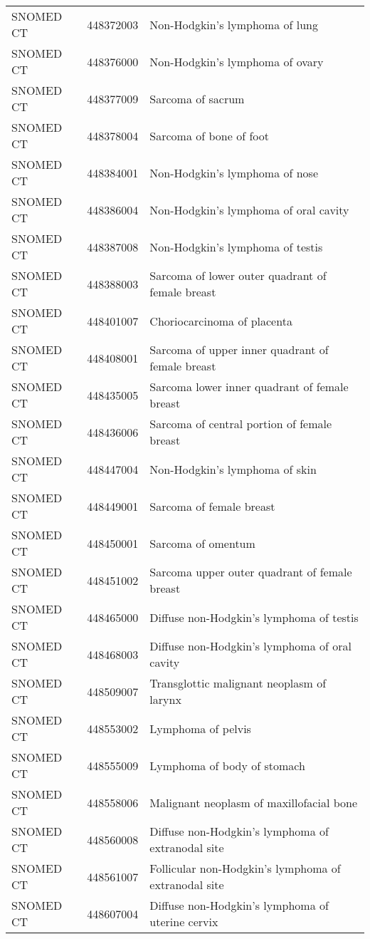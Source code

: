 \begin{longtable}{p{}p{}p{}}
  SNOMED CT & 448372003 & Non-Hodgkin's lymphoma of lung \\ 
  SNOMED CT & 448376000 & Non-Hodgkin's lymphoma of ovary \\ 
  SNOMED CT & 448377009 & Sarcoma of sacrum \\ 
  SNOMED CT & 448378004 & Sarcoma of bone of foot \\ 
  SNOMED CT & 448384001 & Non-Hodgkin's lymphoma of nose \\ 
  SNOMED CT & 448386004 & Non-Hodgkin's lymphoma of oral cavity \\ 
  SNOMED CT & 448387008 & Non-Hodgkin's lymphoma of testis \\ 
  SNOMED CT & 448388003 & Sarcoma of lower outer quadrant of female breast \\ 
  SNOMED CT & 448401007 & Choriocarcinoma of placenta \\ 
  SNOMED CT & 448408001 & Sarcoma of upper inner quadrant of female breast \\ 
  SNOMED CT & 448435005 & Sarcoma lower inner quadrant of female breast \\ 
  SNOMED CT & 448436006 & Sarcoma of central portion of female breast \\ 
  SNOMED CT & 448447004 & Non-Hodgkin's lymphoma of skin \\ 
  SNOMED CT & 448449001 & Sarcoma of female breast \\ 
  SNOMED CT & 448450001 & Sarcoma of omentum \\ 
  SNOMED CT & 448451002 & Sarcoma upper outer quadrant of female breast \\ 
  SNOMED CT & 448465000 & Diffuse non-Hodgkin's lymphoma of testis \\ 
  SNOMED CT & 448468003 & Diffuse non-Hodgkin's lymphoma of oral cavity \\ 
  SNOMED CT & 448509007 & Transglottic malignant neoplasm of larynx \\ 
  SNOMED CT & 448553002 & Lymphoma of pelvis \\ 
  SNOMED CT & 448555009 & Lymphoma of body of stomach \\ 
  SNOMED CT & 448558006 & Malignant neoplasm of maxillofacial bone \\ 
  SNOMED CT & 448560008 & Diffuse non-Hodgkin's lymphoma of extranodal site \\ 
  SNOMED CT & 448561007 & Follicular non-Hodgkin's lymphoma of extranodal site \\ 
  SNOMED CT & 448607004 & Diffuse non-Hodgkin's lymphoma of uterine cervix \\ 

\end{longtable}
